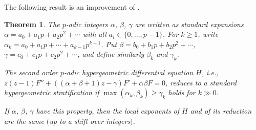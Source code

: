 \documentclass[pdftex]{sigma}
\numberwithin{equation}{section}
\newtheorem{Theorem}{Theorem}[section]
\begin{document}
The following result is an improvement of \cite[Theorem 8.9]{Ma-vdP1}.
 \begin{Theorem} \label{3.6} The $p$-adic integers $\alpha$, $\beta$, $\gamma$ are written as standard expansions $\alpha =a_0+a_1p+a_2p^2+\cdots$ with all $a_i\in \{0,\dots ,p-1\}$. For $k\geq 1$, write $\alpha_k=a_0+a_1p+\cdots +a_{k-1}p^{k-1}$. Put $\beta =b_0+b_1p+b_2p^2+\cdots$, $\gamma =c_0+c_1p+c_2p^2+\cdots$, and define similarly $\beta_k$ and $\gamma_k$.

The second order $p$-adic hypergeometric differential equation $H$, i.e., $ z(z-1)F''+((\alpha +\beta +1)z-\gamma )F'+\alpha \beta F=0$, reduces to a standard hypergeometric stratification if $\max(\alpha_k,\beta_k)\geq \gamma_k$ holds for $k\gg 0$.

If $\alpha$, $\beta$, $\gamma $ have this property, then the local exponents of $H$ and of its reduction are the same $($up to a shift over integers$)$.
 \end{Theorem}
\end{document}
